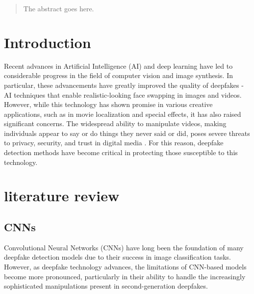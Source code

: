 \documentclass[conference]{IEEEtran}
\begin{document}
		
		
		\maketitle
		
		\begin{abstract}
			The abstract goes here.
		\end{abstract}
		
		
		\IEEEpeerreviewmaketitle
		
		
		
		
		
		\section{Introduction}
		Recent advances in Artificial Intelligence (AI) and deep learning have led to considerable progress in the field of computer vision and image synthesis.
		In particular, these advancements have greatly improved the quality of deepfakes - AI techniques that enable realistic-looking face swapping in images and videos.
		However, while this technology has shown promise in various creative applications, such as in movie localization and special effects, it has also raised significant concerns.
		The widespread ability to manipulate videos, making individuals appear to say or do things they never said or did, poses severe threats to privacy, security, and trust in digital media \cite{privacy-concerns}. For this reason, deepfake detection methods have become critical in protecting those susceptible to this technology.
		
		
		
		\section{literature review}
		
		\subsection{CNNs}
		Convolutional Neural Networks (CNNs) have long been the foundation of many deepfake detection models due to their success in image classification tasks. However, as deepfake technology advances, the limitations of CNN-based models become more pronounced, particularly in their ability to handle the increasingly sophisticated manipulations present in second-generation deepfakes.
		
\end{document}
